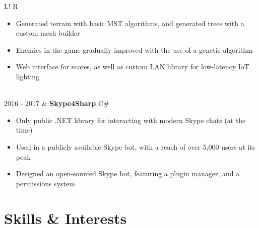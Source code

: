 \documentclass[10pt, a4paper]{article}
\newcommand\vsep{\color{lightgray} \vrule width 0.5pt}
\newcommand\sect[1]{\section*{\Large\sc #1}}
\newcommand\itemizespace{\vspace{-0.8\baselineskip}}
\begin{document}
\begin{tabular}{L!{\vsep}R}
                \begin{itemize}[label=\raisebox{0.25ex}{\tiny$\bullet$}]
                    \setlength{\itemindent}{-0.1in}
                    \item Generated terrain with basic MST algorithms, and generated trees with a custom mesh builder
                    \item Enemies in the game gradually improved with the use of a genetic algorithm
                    \item Web interface for scores, as well as custom LAN library for low-latency IoT lighting
                    \itemizespace
                \end{itemize} \\
                2016 - 2017 & \textbf{Skype4Sharp} \hfill C\#
                \begin{itemize}[label=\raisebox{0.25ex}{\tiny$\bullet$}]
                    \setlength{\itemindent}{-0.1in}
                    \item Only public .NET library for interacting with modern Skype chats (at the time)
                    \item Used in a publicly available Skype bot, with a reach of over 5,000 users at its peak
                    \item Designed an open-sourced Skype bot, featuring a plugin manager, and a permissions system
                    \vspace{-\baselineskip}
                \end{itemize}
            \end{tabular}
        \sect{Skills \& Interests}
\end{document}
